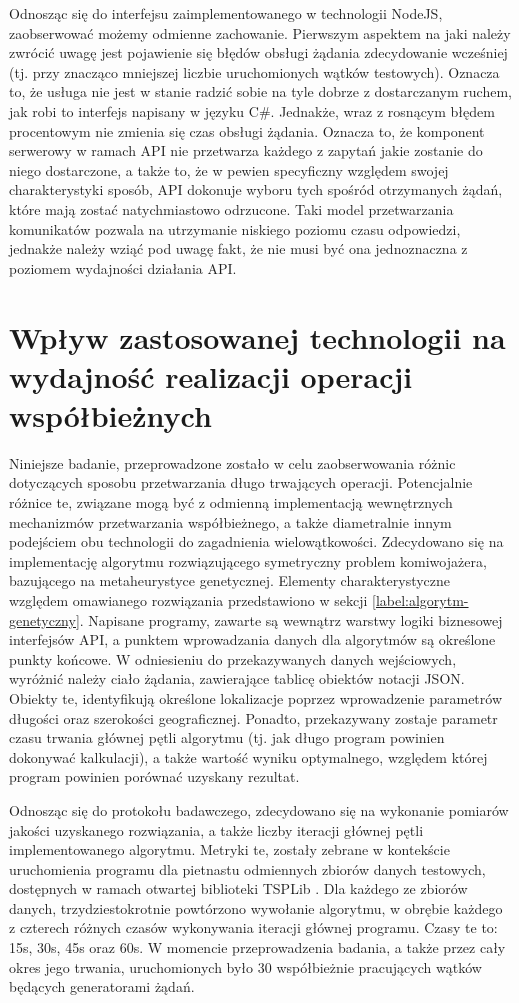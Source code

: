 Odnosząc się do interfejsu zaimplementowanego w technologii NodeJS, zaobserwować możemy odmienne zachowanie. Pierwszym aspektem na jaki należy zwrócić uwagę jest pojawienie się błędów obsługi żądania zdecydowanie wcześniej (tj. przy znacząco mniejszej liczbie uruchomionych wątków testowych). Oznacza to, że usługa nie jest w stanie radzić sobie na tyle dobrze z dostarczanym ruchem, jak robi to interfejs napisany w języku C\#. Jednakże, wraz z rosnącym błędem procentowym nie zmienia się czas obsługi żądania. Oznacza to, że komponent serwerowy w ramach API nie przetwarza każdego z zapytań jakie zostanie do niego dostarczone, a także to, że w pewien specyficzny względem swojej charakterystyki sposób, API dokonuje wyboru tych spośród otrzymanych żądań, które mają zostać natychmiastowo odrzucone. Taki model przetwarzania komunikatów pozwala na utrzymanie niskiego poziomu czasu odpowiedzi, jednakże należy wziąć pod uwagę fakt, że nie musi być ona jednoznaczna z poziomem wydajności działania API.
\section{Wpływ zastosowanej technologii na wydajność realizacji operacji współbieżnych}
Niniejsze badanie, przeprowadzone zostało w celu zaobserwowania różnic dotyczących sposobu przetwarzania długo trwających operacji. Potencjalnie różnice te, związane mogą być z odmienną implementacją wewnętrznych mechanizmów przetwarzania współbieżnego, a także diametralnie innym podejściem obu technologii do zagadnienia wielowątkowości. Zdecydowano się na implementację algorytmu rozwiązującego symetryczny problem komiwojażera, bazującego na metaheurystyce genetycznej. Elementy charakterystyczne względem omawianego rozwiązania przedstawiono w sekcji \ref{label:algorytm-genetyczny}. Napisane programy, zawarte są wewnątrz warstwy logiki biznesowej interfejsów API, a punktem wprowadzania danych dla algorytmów są określone punkty końcowe. W odniesieniu do przekazywanych danych wejściowych, wyróżnić należy ciało żądania, zawierające tablicę obiektów notacji JSON. Obiekty te, identyfikują określone lokalizacje poprzez wprowadzenie parametrów długości oraz szerokości geograficznej. Ponadto, przekazywany zostaje parametr czasu trwania głównej pętli algorytmu (tj. jak długo program powinien dokonywać kalkulacji), a także wartość wyniku optymalnego, względem której program powinien porównać uzyskany rezultat.

Odnosząc się do protokołu badawczego, zdecydowano się na wykonanie pomiarów jakości uzyskanego rozwiązania, a także liczby iteracji głównej pętli implementowanego algorytmu. Metryki te, zostały zebrane w kontekście uruchomienia programu dla pietnastu odmiennych zbiorów danych testowych, dostępnych w ramach otwartej biblioteki TSPLib \cite{TSPLIB_ARTICLE}. Dla każdego ze zbiorów danych, trzydziestokrotnie powtórzono wywołanie algorytmu, w obrębie każdego z czterech różnych czasów wykonywania iteracji głównej programu. Czasy te to: 15s, 30s, 45s oraz 60s. W momencie przeprowadzenia badania, a także przez cały okres jego trwania, uruchomionych było 30 współbieżnie pracujących wątków będących generatorami żądań.

